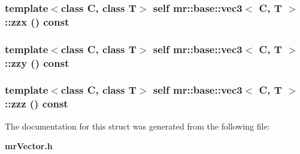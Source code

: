 \subsubsection{\setlength{\rightskip}{0pt plus 5cm}template$<$class C, class T$>$ {\bf self} {\bf mr::base::vec3}$<$ C, T $>$::zzx () const\hspace{0.3cm}{\tt  [inline]}}\label{structmr_1_1base_1_1vec3_z44_28}


\subsubsection{\setlength{\rightskip}{0pt plus 5cm}template$<$class C, class T$>$ {\bf self} {\bf mr::base::vec3}$<$ C, T $>$::zzy () const\hspace{0.3cm}{\tt  [inline]}}\label{structmr_1_1base_1_1vec3_z44_27}


\subsubsection{\setlength{\rightskip}{0pt plus 5cm}template$<$class C, class T$>$ {\bf self} {\bf mr::base::vec3}$<$ C, T $>$::zzz () const\hspace{0.3cm}{\tt  [inline]}}\label{structmr_1_1base_1_1vec3_z44_6}




The documentation for this struct was generated from the following file:\begin{CompactItemize}
\item 
{\bf mr\-Vector.h}\end{CompactItemize}
